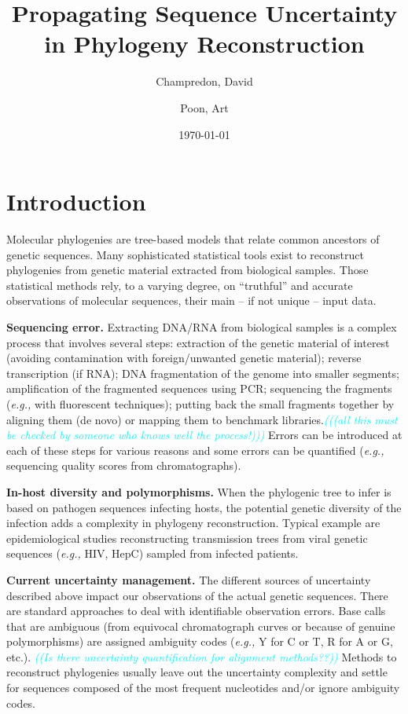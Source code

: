 \documentclass[10pt]{article}
\title{Propagating Sequence Uncertainty in Phylogeny Reconstruction}
\author{Champredon, David \and Poon, Art}
\date{\today}
\newcommand{\comment}[1]{\textsl{\textcolor{cyan}{((#1))}}}
\newcommand{\eg}{\textit{e.g.,}\xspace}
\begin{document}
\maketitle
\linenumbers

\section{Introduction}

Molecular phylogenies are tree-based models that relate common ancestors of genetic sequences.
Many sophisticated statistical tools exist to reconstruct phylogenies from genetic material extracted from biological samples. 
Those statistical methods rely, to a varying degree, on ``truthful'' and accurate observations of molecular sequences, their main -- if not unique -- input data.

\textbf{Sequencing error.} 
Extracting DNA/RNA from biological samples is a complex process that involves several steps: extraction of the genetic material of interest (avoiding contamination with foreign/unwanted genetic material); reverse transcription (if RNA); DNA fragmentation of the genome into smaller segments; amplification of the fragmented sequences using PCR; sequencing the fragments (\eg with fluorescent techniques); putting back the small fragments together by aligning them (de novo) or mapping them to benchmark libraries.\comment{(all this must be checked by someone who knows well the process!)}
Errors can be introduced at each of these steps for various reasons \cite{Beerenwinkel:2011} and some errors can be quantified (\eg sequencing quality scores from chromatographs). 

\textbf{In-host diversity and polymorphisms.} 
When the phylogenic tree to infer is based on pathogen sequences infecting hosts, the potential genetic diversity of the infection adds a complexity in phylogeny reconstruction. Typical example are epidemiological studies reconstructing transmission trees from viral genetic sequences (\eg HIV, HepC) sampled from infected patients. 


\textbf{Current uncertainty management.} 
The different sources of uncertainty described above impact our observations of the actual genetic sequences.
There are standard approaches to deal with identifiable observation errors. 
Base calls that are ambiguous (from equivocal chromatograph curves or because of genuine polymorphisms) are assigned ambiguity codes (\eg Y for C or T, R for A or G, etc.).
\comment{Is there uncertainty quantification for alignment methods??}
Methods to reconstruct phylogenies usually leave out the uncertainty complexity and settle for sequences composed of the most frequent nucleotides and/or ignore ambiguity codes.
\end{document}
